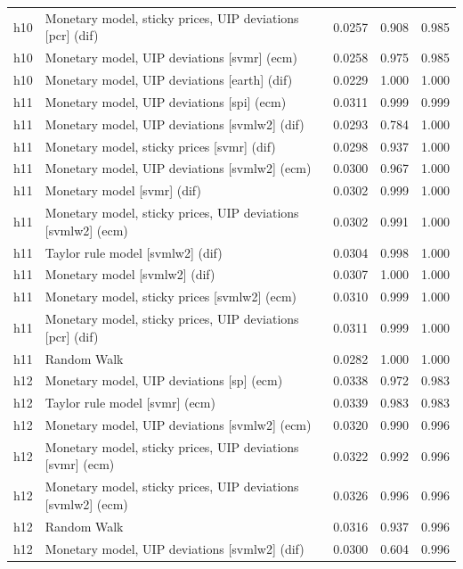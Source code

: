 \begin{ThreePartTable}
\begin{longtable}[t]{cp{5.5cm}ccc}
h10 & \raggedright Monetary model, sticky prices, UIP deviations [pcr] (dif) & 0.0257 & 0.908 & 0.985\\
h10 & \raggedright Monetary model, UIP deviations [svmr] (ecm) & 0.0258 & 0.975 & 0.985\\
h10 & \raggedright Monetary model, UIP deviations [earth] (dif) & 0.0229 & 1.000 & 1.000\\
\addlinespace
h11 & \raggedright Monetary model, UIP deviations [spi] (ecm) & 0.0311 & 0.999 & 0.999\\
h11 & \raggedright Monetary model, UIP deviations [svmlw2] (dif) & 0.0293 & 0.784 & 1.000\\
h11 & \raggedright Monetary model, sticky prices [svmr] (dif) & 0.0298 & 0.937 & 1.000\\
h11 & \raggedright Monetary model, UIP deviations [svmlw2] (ecm) & 0.0300 & 0.967 & 1.000\\
h11 & \raggedright Monetary model [svmr] (dif) & 0.0302 & 0.999 & 1.000\\
h11 & \raggedright Monetary model, sticky prices, UIP deviations [svmlw2] (ecm) & 0.0302 & 0.991 & 1.000\\
h11 & \raggedright Taylor rule model [svmlw2] (dif) & 0.0304 & 0.998 & 1.000\\
h11 & \raggedright Monetary model [svmlw2] (dif) & 0.0307 & 1.000 & 1.000\\
h11 & \raggedright Monetary model, sticky prices [svmlw2] (ecm) & 0.0310 & 0.999 & 1.000\\
h11 & \raggedright Monetary model, sticky prices, UIP deviations [pcr] (dif) & 0.0311 & 0.999 & 1.000\\
h11 & \raggedright Random Walk & 0.0282 & 1.000 & 1.000\\
\addlinespace
h12 & \raggedright Monetary model, UIP deviations [sp] (ecm) & 0.0338 & 0.972 & 0.983\\
h12 & \raggedright Taylor rule model [svmr] (ecm) & 0.0339 & 0.983 & 0.983\\
h12 & \raggedright Monetary model, UIP deviations [svmlw2] (ecm) & 0.0320 & 0.990 & 0.996\\
h12 & \raggedright Monetary model, sticky prices, UIP deviations [svmr] (ecm) & 0.0322 & 0.992 & 0.996\\
h12 & \raggedright Monetary model, sticky prices, UIP deviations [svmlw2] (ecm) & 0.0326 & 0.996 & 0.996\\
h12 & \raggedright Random Walk & 0.0316 & 0.937 & 0.996\\
h12 & \raggedright Monetary model, UIP deviations [svmlw2] (dif) & 0.0300 & 0.604 & 0.996\\

\end{longtable}
\end{ThreePartTable}
